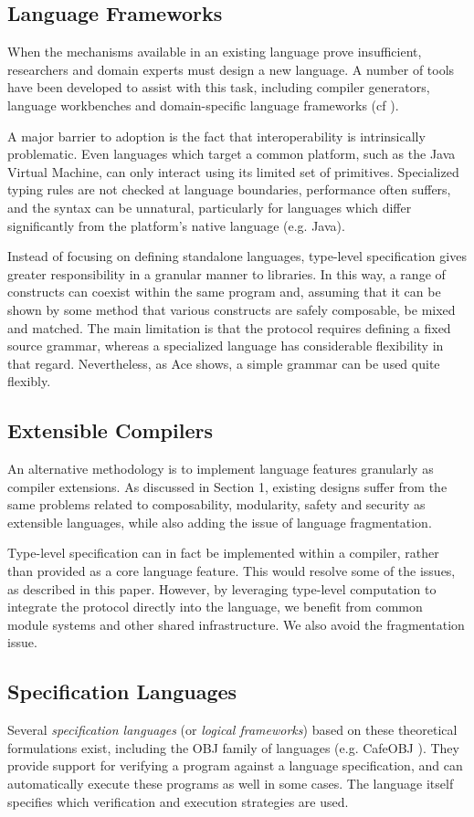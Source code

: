 \documentclass[10pt]{sigplanconf}
\begin{document}
\subsection{Language Frameworks}
When the mechanisms available in an existing language prove insufficient, researchers and domain experts must design a new language. A number of tools have been developed to assist with this task, including compiler generators, language workbenches and domain-specific language frameworks (cf \cite{fowler2010domain}).

A major barrier to adoption is the fact that interoperability is intrinsically problematic. Even languages which target a common platform, such as the Java Virtual Machine, can only interact using its limited set of primitives. Specialized typing rules are not checked at language boundaries, performance often suffers, and the syntax can be unnatural, particularly for languages which differ significantly from the platform's native language (e.g. Java).

Instead of focusing on defining standalone languages, type-level specification gives greater responsibility in a granular manner to libraries. In this way, a range of constructs can coexist within the same program and, assuming that it can be shown by some method that various constructs are safely composable, be mixed and matched. The main limitation is that the protocol requires defining a fixed source grammar, whereas a specialized language has considerable flexibility in that regard. Nevertheless, as Ace shows, a simple grammar can be used quite flexibly.
\subsection{Extensible Compilers}
An alternative methodology is to implement language features granularly as compiler extensions. As discussed in Section 1, existing designs suffer from the same problems related to composability, modularity\-, safety and security as extensible languages, while also adding the issue of language fragmentation.

Type-level specification can in fact be implemented within a compiler, rather than provided as a core language feature. This would resolve some of the issues, as described in this paper. However, by leveraging type-level computation to integrate the protocol directly into the language, we benefit from common module systems and other shared infrastructure. We also avoid the fragmentation issue.
\subsection{Specification Languages}
Several {\it specification languages} (or {\it logical frameworks}) based on these theoretical formulations exist, including the OBJ family of languages (e.g. CafeOBJ \cite{Diaconescu-Futatsugi01}). They provide support for verifying a program against a language specification, and can automatically execute these programs as well in some cases. The  language itself specifies which verification and execution strategies are used.
\end{document}
